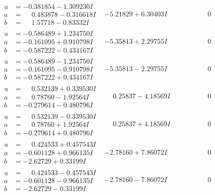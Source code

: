 \documentclass[1p]{elsarticle_modified}
\theoremstyle{definition}
\begin{document}
$$\begin{array}{c|c|c}
\begin{aligned}
u &= -0.381854 - 1.309230 I \\
a &= \phantom{-}0.483878 - 0.316618 I \\
b &= \phantom{-}1.57718 - 0.83332 I\end{aligned}
 & -5.21829 + 6.30403 I & \phantom{-0.000000 } 0 \\ \hline\begin{aligned}
u &= -0.586489 + 1.234750 I \\
a &= -0.161095 + 0.910798 I \\
b &= -0.587222 - 0.434167 I\end{aligned}
 & -5.35813 + 2.29755 I & \phantom{-0.000000 } 0 \\ \hline\begin{aligned}
u &= -0.586489 - 1.234750 I \\
a &= -0.161095 - 0.910798 I \\
b &= -0.587222 + 0.434167 I\end{aligned}
 & -5.35813 - 2.29755 I & \phantom{-0.000000 } 0 \\ \hline\begin{aligned}
u &= \phantom{-}0.532139 + 0.339530 I \\
a &= \phantom{-}0.78760 - 1.92564 I \\
b &= -0.279614 - 0.480796 I\end{aligned}
 & \phantom{-}0.25837 - 4.18569 I & \phantom{-0.000000 } 0 \\ \hline\begin{aligned}
u &= \phantom{-}0.532139 - 0.339530 I \\
a &= \phantom{-}0.78760 + 1.92564 I \\
b &= -0.279614 + 0.480796 I\end{aligned}
 & \phantom{-}0.25837 + 4.18569 I & \phantom{-0.000000 } 0 \\ \hline\begin{aligned}
u &= \phantom{-}0.424533 + 0.457543 I \\
a &= -0.601128 + 0.966135 I \\
b &= -2.62729 + 0.33199 I\end{aligned}
 & -2.78160 + 7.86072 I & \phantom{-0.000000 } 0 \\ \hline\begin{aligned}
u &= \phantom{-}0.424533 - 0.457543 I \\
a &= -0.601128 - 0.966135 I \\
b &= -2.62729 - 0.33199 I\end{aligned}
 & -2.78160 - 7.86072 I & \phantom{-0.000000 } 0\\

\end{array}$$
\end{document}
